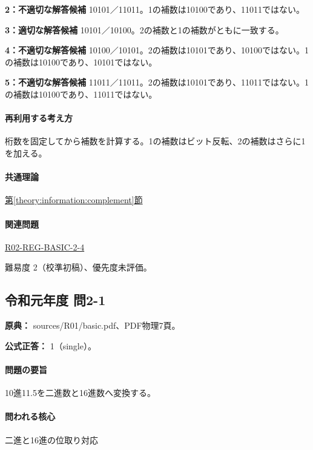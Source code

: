 \noindent\textbf{2：不適切な解答候補} 10101／11011。1の補数は10100であり、11011ではない。\par

\noindent\textbf{3：適切な解答候補} 10101／10100。2の補数と1の補数がともに一致する。\par

\noindent\textbf{4：不適切な解答候補} 10100／10101。2の補数は10101であり、10100ではない。1の補数は10100であり、10101ではない。\par

\noindent\textbf{5：不適切な解答候補} 11011／11011。2の補数は10101であり、11011ではない。1の補数は10100であり、11011ではない。\par

\paragraph{再利用する考え方} 桁数を固定してから補数を計算する。1の補数はビット反転、2の補数はさらに1を加える。

\paragraph{共通理論} \hyperref[theory:information:complement]{第\ref*{theory:information:complement}節}

\paragraph{関連問題} \hyperref[q:r02-reg-basic-2-4]{R02-REG-BASIC-2-4}

\par 難易度 2（校準初稿）、優先度未評価。

\subsection{令和元年度 問2-1}
\label{q:r01-reg-basic-2-1}

\noindent\textbf{原典：} sources/R01/basic.pdf、PDF物理7頁。

\textbf{公式正答：} 1（single）。

\paragraph{問題の要旨} 10進11.5を二進数と16進数へ変換する。

\paragraph{問われる核心} 二進と16進の位取り対応

